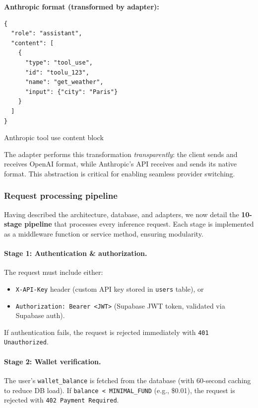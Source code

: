 \documentclass[english]{article}
\begin{document}
\textbf{Anthropic format (transformed by adapter):}
\begin{listing}[H]
\begin{verbatim}
{
  "role": "assistant",
  "content": [
    {
      "type": "tool_use",
      "id": "toolu_123",
      "name": "get_weather",
      "input": {"city": "Paris"}
    }
  ]
}
\end{verbatim}
\caption{Anthropic tool use content block}
\end{listing}

The adapter performs this transformation \emph{transparently}: the client sends and receives OpenAI format, while Anthropic's API receives and sends its native format. This abstraction is critical for enabling seamless provider switching.


\subsubsection{Request processing pipeline}

Having described the architecture, database, and adapters, we now detail the \textbf{10-stage pipeline} that processes every inference request. Each stage is implemented as a middleware function or service method, ensuring modularity.

\paragraph{Stage 1: Authentication \& authorization.}

The request must include either:
\begin{itemize}
    \item \texttt{X-API-Key} header (custom API key stored in \texttt{users} table), or
    \item \texttt{Authorization: Bearer <JWT>} (Supabase JWT token, validated via Supabase auth).
\end{itemize}

If authentication fails, the request is rejected immediately with \texttt{401 Unauthorized}.

\paragraph{Stage 2: Wallet verification.}

The user's \texttt{wallet\_balance} is fetched from the database (with 60-second caching to reduce DB load). If \texttt{balance < MINIMAL\_FUND} (e.g., \$0.01), the request is rejected with \texttt{402 Payment Required}.
\end{document}
